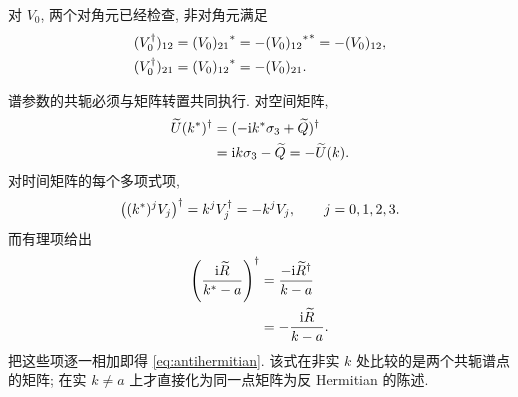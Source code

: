 对 $V_0$, 两个对角元已经检查, 非对角元满足
\begin{align*}
(V_0^\dagger)_{12}
&={(V_0)_{21}}^{*}
={-{(V_0)_{12}}^{*}}^{*}=-(V_0)_{12},\\
(V_0^\dagger)_{21}
&={(V_0)_{12}}^{*}=-(V_0)_{21}.
\end{align*}
\par\smallskip\noindent 谱参数的共轭必须与矩阵转置共同执行.\quad
对空间矩阵,
\begin{align*}
\widetilde U({k}^{*})^\dagger
&=(-\mathrm{i}{k}^{*}\sigma_3+\widetilde Q)^\dagger\\
&=\mathrm{i} k\sigma_3-\widetilde Q
=-\widetilde U(k).
\end{align*}
对时间矩阵的每个多项式项,
\begin{equation*}
\bigl(({k}^{*})^jV_j\bigr)^\dagger
=k^jV_j^\dagger=-k^jV_j,
\qquad j=0,1,2,3.
\end{equation*}
而有理项给出
\begin{align*}
\left(\dfrac{\mathrm{i}\widetilde R}{{k}^{*}-a}\right)^\dagger
&=\dfrac{-\mathrm{i}\widetilde R^\dagger}{k-a}\\
&=-\dfrac{\mathrm{i}\widetilde R}{k-a}.
\end{align*}
把这些项逐一相加即得 \eqref{eq:antihermitian}. 该式在非实 $k$ 处比较的是两个共轭谱点的矩阵; 在实 $k\ne a$ 上才直接化为同一点矩阵为反 Hermitian 的陈述.


